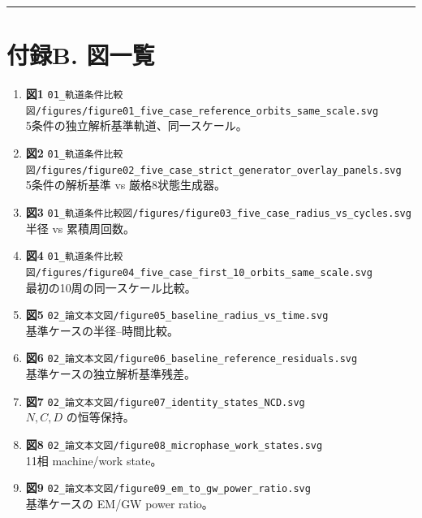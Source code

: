 \documentclass[
  a4paper,
]{ltjsarticle}
\begin{document}
\begin{center}\rule{0.5\linewidth}{0.5pt}\end{center}

\section{付録B. 図一覧}\label{ux4ed8ux9332b.-ux56f3ux4e00ux89a7}

\begin{enumerate}
\def\labelenumi{\arabic{enumi}.}
\item
  \textbf{図1}
  \texttt{01\_\allowbreak{}軌道条件比較図/\allowbreak{}figures/\allowbreak{}figure01\_\allowbreak{}five\_\allowbreak{}case\_\allowbreak{}reference\_\allowbreak{}orbits\_\allowbreak{}same\_\allowbreak{}scale.svg}\\
  5条件の独立解析基準軌道、同一スケール。
\item
  \textbf{図2}
  \texttt{01\_\allowbreak{}軌道条件比較図/\allowbreak{}figures/\allowbreak{}figure02\_\allowbreak{}five\_\allowbreak{}case\_\allowbreak{}strict\_\allowbreak{}generator\_\allowbreak{}overlay\_\allowbreak{}panels.svg}\\
  5条件の解析基準 vs 厳格8状態生成器。
\item
  \textbf{図3}
  \texttt{01\_\allowbreak{}軌道条件比較図/\allowbreak{}figures/\allowbreak{}figure03\_\allowbreak{}five\_\allowbreak{}case\_\allowbreak{}radius\_\allowbreak{}vs\_\allowbreak{}cycles.svg}\\
  半径 vs 累積周回数。
\item
  \textbf{図4}
  \texttt{01\_\allowbreak{}軌道条件比較図/\allowbreak{}figures/\allowbreak{}figure04\_\allowbreak{}five\_\allowbreak{}case\_\allowbreak{}first\_\allowbreak{}10\_\allowbreak{}orbits\_\allowbreak{}same\_\allowbreak{}scale.svg}\\
  最初の10周の同一スケール比較。
\item
  \textbf{図5}
  \texttt{02\_\allowbreak{}論文本文図/\allowbreak{}figure05\_\allowbreak{}baseline\_\allowbreak{}radius\_\allowbreak{}vs\_\allowbreak{}time.svg}\\
  基準ケースの半径--時間比較。
\item
  \textbf{図6}
  \texttt{02\_\allowbreak{}論文本文図/\allowbreak{}figure06\_\allowbreak{}baseline\_\allowbreak{}reference\_\allowbreak{}residuals.svg}\\
  基準ケースの独立解析基準残差。
\item
  \textbf{図7}
  \texttt{02\_\allowbreak{}論文本文図/\allowbreak{}figure07\_\allowbreak{}identity\_\allowbreak{}states\_\allowbreak{}NCD.svg}\\
  \(N,C,D\) の恒等保持。
\item
  \textbf{図8}
  \texttt{02\_\allowbreak{}論文本文図/\allowbreak{}figure08\_\allowbreak{}microphase\_\allowbreak{}work\_\allowbreak{}states.svg}\\
  11相 machine/work state。
\item
  \textbf{図9}
  \texttt{02\_\allowbreak{}論文本文図/\allowbreak{}figure09\_\allowbreak{}em\_\allowbreak{}to\_\allowbreak{}gw\_\allowbreak{}power\_\allowbreak{}ratio.svg}\\
  基準ケースの EM/GW power ratio。
\end{enumerate}
\end{document}
